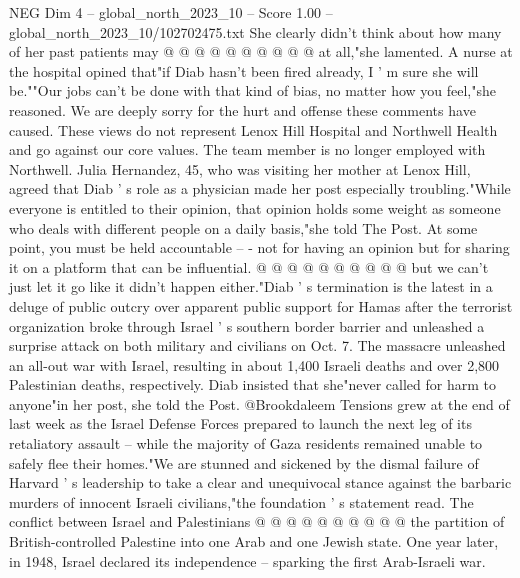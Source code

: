 \begin{textsample}{NEG Dim 4 – global\_north\_2023\_10 – Score 1.00 – global\_north\_2023\_10/102702475.txt}
She clearly didn't think about how many of her past patients may @ @ @ @ @ @ @ @ @ @ at all,"she lamented.
A nurse at the hospital opined that"if Diab hasn't been fired already, I ' m sure she will be.""Our jobs can't be done with that kind of bias, no matter how you feel,"she reasoned.
We are deeply sorry for the hurt and offense these comments have caused.
These views do not represent Lenox Hill Hospital and Northwell Health and go against our core values.
The team member is no longer employed with Northwell.
Julia Hernandez, 45, who was visiting her mother at Lenox Hill, agreed that Diab ' s role as a physician made her post especially troubling."While everyone is entitled to their opinion, that opinion holds some weight as someone who deals with different people on a daily basis,"she told The Post.
At some point, you must be held accountable -- - not for having an opinion but for sharing it on a platform that can be influential. @ @ @ @ @ @ @ @ @ @ but we can't just let it go like it didn't happen either."Diab ' s termination is the latest in a deluge of public outcry over apparent public support for Hamas after the terrorist organization broke through Israel ' s southern border barrier and unleashed a surprise attack on both military and civilians on Oct. 7.
The massacre unleashed an all-out war with Israel, resulting in about 1,400 Israeli deaths and over 2,800 Palestinian deaths, respectively.
Diab insisted that she"never called for harm to anyone"in her post, she told the Post. @Brookdaleem Tensions grew at the end of last week as the Israel Defense Forces prepared to launch the next leg of its retaliatory assault -- while the majority of Gaza residents remained unable to safely flee their homes."We are stunned and sickened by the dismal failure of Harvard ' s leadership to take a clear and unequivocal stance against the barbaric murders of innocent Israeli civilians,"the foundation ' s statement read.
The conflict between Israel and Palestinians @ @ @ @ @ @ @ @ @ @ the partition of British-controlled Palestine into one Arab and one Jewish state.
One year later, in 1948, Israel declared its independence -- sparking the first Arab-Israeli war.

\end{textsample}
